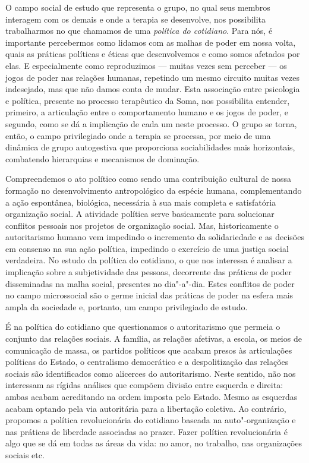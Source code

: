 O campo social de estudo que representa o grupo, no qual seus membros
interagem com os demais e onde a terapia se desenvolve, nos possibilita
trabalharmos no que chamamos de uma \emph{política do cotidiano}. Para
nós, é importante percebermos como lidamos com as malhas de poder em
nossa volta, quais as práticas políticas e éticas que desenvolvemos e
como somos afetados por elas. E especialmente como reproduzimos --- muitas
vezes sem perceber --- os jogos de poder nas relações humanas, repetindo
um mesmo circuito muitas vezes indesejado, mas que não damos conta de
mudar. Esta associação entre psicologia e política, presente no processo
terapêutico da Soma, nos possibilita entender, primeiro, a articulação
entre o comportamento humano e os jogos de poder, e segundo, como se dá
a implicação de cada um neste processo. O grupo se torna, então, o campo
privilegiado onde a terapia se processa, por meio de uma dinâmica de
grupo autogestiva que proporciona sociabilidades mais horizontais,
combatendo hierarquias e mecanismos de dominação.

Compreendemos o ato político como sendo uma contribuição cultural de
nossa formação no desenvolvimento antropológico da espécie humana,
complementando a ação espontânea, biológica, necessária à sua mais
completa e satisfatória organização social. A atividade política serve
basicamente para solucionar conflitos pessoais nos projetos de
organização social. Mas, historicamente o autoritarismo humano vem
impedindo o incremento da solidariedade e as decisões em consenso na sua
ação política, impedindo o exercício de uma justiça social verdadeira.
No estudo da política do cotidiano, o que nos interessa é analisar a
implicação sobre a subjetividade das pessoas, decorrente das práticas de
poder disseminadas na malha social, presentes no dia"-a"-dia. Estes
conflitos de poder no campo microssocial são o germe inicial das práticas
de poder na esfera mais ampla da sociedade e, portanto, um campo
privilegiado de estudo.

É na política do cotidiano que questionamos o autoritarismo que permeia
o conjunto das relações sociais. A família, as relações afetivas, a
escola, os meios de comunicação de massa, os partidos políticos que
acabam presos às articulações políticas do Estado, o centralismo
democrático e a despolitização das relações sociais são identificados
como alicerces do autoritarismo. Neste sentido, não nos interessam as
rígidas análises que compõem divisão entre esquerda e direita: ambas
acabam acreditando na ordem imposta pelo Estado. Mesmo as esquerdas
acabam optando pela via autoritária para a libertação coletiva. Ao
contrário, propomos a política revolucionária do cotidiano baseada na
auto"-organização e nas práticas de liberdade associadas ao prazer. Fazer
política revolucionária é algo que se dá em todas as áreas da vida: no
amor, no trabalho, nas organizações sociais etc.

